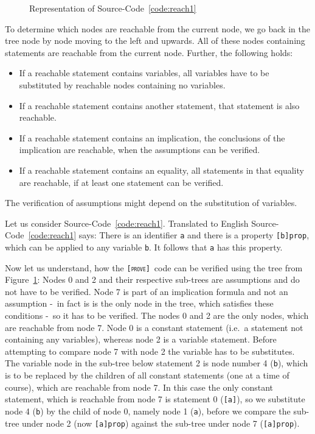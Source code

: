 \documentclass[british]{article}
\newcommand\prv{bc}
\newcommand\m[1]{\texttt{#1}}
\newcommand\name{\texttt{\textsc{[prove]}}}
\newcommand\scref[1]{Source-Code~\ref{code:#1}}
\newcommand\figref[1]{Figure~\ref{fig:#1}}
\begin{document}
\begin{figure}[!h]
\caption{Representation of \scref{reach1}}\label{fig:reach1}
\centering
{}
\subfloat[\centering Graph of \scref{reach1}]{
	\texttt{[image: tikz/reach1.pdf]}
}
\end{figure}

To determine which nodes are reachable from the current node, we go back in the tree node by node moving to the left and upwards. All of these nodes containing statements are reachable from the current node. Further, the following holds:

\begin{itemize}
	\item
		If a reachable statement contains variables, all variables have to be substituted by reachable nodes containing no variables.
	\item
		If a reachable statement contains another statement, that statement is also reachable.
	\item
		If a reachable statement contains an implication, the conclusions of the implication are reachable, when the assumptions can be verified. 
	\item
		If a reachable statement contains an equality, all statements in that equality are reachable, if at least one statement can be verified.
\end{itemize}

The verification of assumptions might depend on the substitution of variables.
\newline

Let us consider \scref{reach1}. Translated to English \scref{reach1} says: There is an identifier \m{a} and there is a property \m{[b]prop}, which can be applied to any variable \m{b}. It follows that \m{a} has this property.
\newline

Now let us understand, how the \name\ code can be verified using the tree from \figref{reach1}: Nodes 0 and 2 and their respective sub-trees are assumptions and do not have to be verified. Node 7 is part of an implication formula and not an assumption -\ in fact is is the only node in the tree, which satisfies these conditions -\ so it has to be verified. The nodes 0 and 2 are the only nodes, which are reachable from node 7. Node 0 is a constant statement (i.e.\ a statement not containing any variables), whereas node 2 is a variable statement. Before attempting to compare node 7 with node 2 the variable has to be substitutes. The variable node in the sub-tree below statement 2 is node number 4 (\m{b}), which is to be replaced by the children of all constant statements (one at a time of course), which are reachable from node 7. In this case the only constant statement, which is reachable from node 7 is statement 0 (\m{[a]}), so we substitute node 4 (\m{b}) by the child of node 0, namely node 1 (\m{a}), before we compare the sub-tree under node 2 (now \m{[a]prop}) against the sub-tree under node 7 (\m{[a]prop}).
\newline
\end{document}
